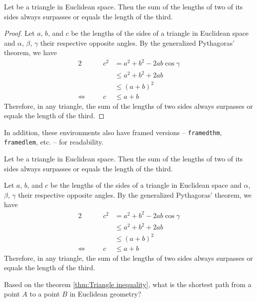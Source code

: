 \documentclass[a4paper, 12pt]{report}
\begin{document}
\begin{thm}
	Let be a triangle in Euclidean space. Then the sum of the lengths of two of its sides always surpasses or equals the length of the third.
\end{thm}

\begin{proof}
	Let $a$, $b$, and $c$ be the lengths of the sides of a triangle in Euclidean space and $\alpha$, $\beta$, $\gamma$ their respective opposite angles. By the generalized Pythagoras' theorem, we have
	\begin{alignat*}{2}
		&  & c^2 & = a^2 + b^2 - 2ab \cos\gamma \\
		&  &     & \leq a^2 + b^2 + 2ab         \\
		&  &     & \leq (a + b)^2               \\
		\Leftrightarrow \quad &  & c   & \leq a + b
	\end{alignat*}
	Therefore, in any triangle, the sum of the lengths of two sides always surpasses or equals the length of the third.
\end{proof}

In addition, these environments also have framed versions -- \texttt{framedthm}, \texttt{framedlem}, etc. -- for readability.

\begin{framedthm}\label{thm:Triangle inequality}
	Let be a triangle in Euclidean space. Then the sum of the lengths of two of its sides always surpasses or equals the length of the third.
\end{framedthm}

\begin{framedprf}
	Let $a$, $b$, and $c$ be the lengths of the sides of a triangle in Euclidean space and $\alpha$, $\beta$, $\gamma$ their respective opposite angles. By the generalized Pythagoras' theorem, we have
	\begin{alignat*}{2}
		&  & c^2 & = a^2 + b^2 - 2ab \cos\gamma \\
		&  &     & \leq a^2 + b^2 + 2ab         \\
		&  &     & \leq (a + b)^2               \\
		\Leftrightarrow \quad &  & c   & \leq a + b
	\end{alignat*}
	Therefore, in any triangle, the sum of the lengths of two sides always surpasses or equals the length of the third. \qedadd
\end{framedprf}

\begin{framedquest*}
	Based on the theorem \ref{thm:Triangle inequality}, what is the shortest path from a point $A$ to a point $B$ in Euclidean geometry?
\end{framedquest*}

   

\end{document}
